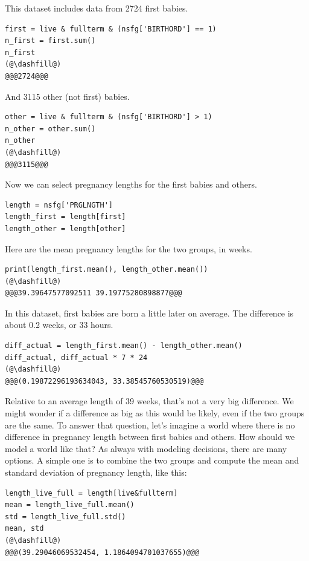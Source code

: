 This dataset includes data from 2724 first babies.

\begin{lstlisting}[]
first = live & fullterm & (nsfg['BIRTHORD'] == 1)
n_first = first.sum()
n_first
(@\dashfill@)
@@@2724@@@
\end{lstlisting}

And 3115 other (not first) babies.

\begin{lstlisting}[]
other = live & fullterm & (nsfg['BIRTHORD'] > 1)
n_other = other.sum()
n_other
(@\dashfill@)
@@@3115@@@
\end{lstlisting}

Now we can select pregnancy lengths for the first babies and others.

\begin{lstlisting}[]
length = nsfg['PRGLNGTH']
length_first = length[first]
length_other = length[other]
\end{lstlisting}

Here are the mean pregnancy lengths for the two groups, in weeks.

\begin{lstlisting}[]
print(length_first.mean(), length_other.mean())
(@\dashfill@)
@@@39.39647577092511 39.19775280898877@@@
\end{lstlisting}

In this dataset, first babies are born a little later on average. The
difference is about 0.2 weeks, or 33 hours.

\begin{lstlisting}[]
diff_actual = length_first.mean() - length_other.mean()
diff_actual, diff_actual * 7 * 24
(@\dashfill@)
@@@(0.19872296193634043, 33.38545760530519)@@@
\end{lstlisting}

Relative to an average length of 39 weeks, that's not a very big
difference. We might wonder if a difference as big as this would be
likely, even if the two groups are the same. To answer that question,
let's imagine a world where there is no difference in pregnancy length
between first babies and others. How should we model a world like that?
As always with modeling decisions, there are many options. A simple one
is to combine the two groups and compute the mean and standard deviation
of pregnancy length, like this:

\begin{lstlisting}[]
length_live_full = length[live&fullterm]
mean = length_live_full.mean()
std = length_live_full.std()
mean, std
(@\dashfill@)
@@@(39.29046069532454, 1.1864094701037655)@@@
\end{lstlisting}

